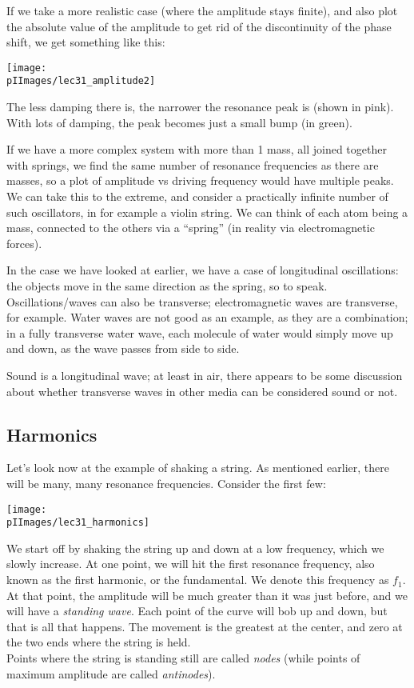 If we take a more realistic case (where the amplitude stays finite), and also plot the absolute value of the amplitude to get rid of the discontinuity of the phase shift, we get something like this:

\begin{center}
\texttt{[image: \\pIImages/lec31\_amplitude2]}
\end{center}

The less damping there is, the narrower the resonance peak is (shown in pink). With lots of damping, the peak becomes just a small bump (in green).

If we have a more complex system with more than 1 mass, all joined together with springs, we find the same number of resonance frequencies as there are masses, so a plot of amplitude vs driving frequency would have multiple peaks.\\
We can take this to the extreme, and consider a practically infinite number of such oscillators, in for example a violin string. We can think of each atom being a mass, connected to the others via a ``spring'' (in reality via electromagnetic forces).

In the case we have looked at earlier, we have a case of longitudinal oscillations: the objects move in the same direction as the spring, so to speak.\\
Oscillations/waves can also be transverse; electromagnetic waves are transverse, for example. Water waves are not good as an example, as they are a combination; in a fully transverse water wave, each molecule of water would simply move up and down, as the wave passes from side to side.

Sound is a longitudinal wave; at least in air, there appears to be some discussion about whether transverse waves in other media can be considered sound or not.

\subsection{Harmonics}

Let's look now at the example of shaking a string. As mentioned earlier, there will be many, many resonance frequencies. Consider the first few:

\begin{center}
\texttt{[image: \\pIImages/lec31\_harmonics]}
\end{center}

We start off by shaking the string up and down at a low frequency, which we slowly increase. At one point, we will hit the first resonance frequency, also known as the first harmonic, or the fundamental. We denote this frequency as $f_1$.\\
At that point, the amplitude will be much greater than it was just before, and we will have a \emph{standing wave}. Each point of the curve will bob up and down, but that is all that happens. The movement is the greatest at the center, and zero at the two ends where the string is held.\\
Points where the string is standing still are called \emph{nodes} (while points of maximum amplitude are called \emph{antinodes}).


